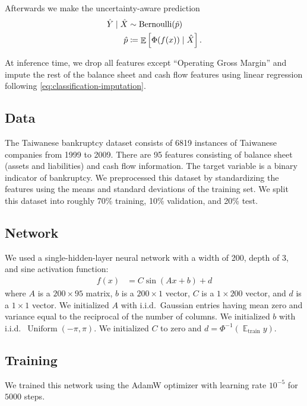 \documentclass{article}
\DeclareMathOperator{\expect}{\mathbb{E}}
\begin{document}
Afterwards we make the uncertainty-aware prediction
\begin{align}
  \hat Y \mid \hat X &\sim \operatorname{Bernoulli}(\hat p)
  \\
  \hat p &\coloneqq \expect\sbr{\Phi(f(x)) \mid \hat X}.
  \label{eq:classification-mean}
\end{align}


At inference time, we drop all features except ``Operating Gross Margin'' and impute the rest of the balance sheet and cash flow features using linear regression following \eqref{eq:classification-imputation}.

\subsection{Data}
The Taiwanese bankruptcy dataset \citep{unknown_taiwanese_2020,liang_financial_2016} consists of 6819 instances of Taiwanese companies from 1999 to 2009.
There are 95 features consisting of balance sheet (assets and liabilities) and cash flow information.
The target variable is a binary indicator of bankruptcy.
We preprocessed this dataset by standardizing the features using the means and standard deviations of the training set.
We split this dataset into roughly 70\% training, 10\% validation, and 20\% test.


\subsection{Network}
We used a single-hidden-layer neural network with a width of 200, depth of 3, and sine activation function:
\begin{align}
  f(x) &= C \sin(A x + b) + d
\end{align}
where \(A\) is a \(200 \times 95\) matrix, \(b\) is a \(200 \times 1\) vector, \(C\) is a \(1 \times 200\) vector, and \(d\) is a \(1 \times 1\) vector.
We initialized \(A\) with i.i.d.~Gaussian entries having mean zero and variance equal to the reciprocal of the number of columns.
We initialized \(b\) with i.i.d.~\(\operatorname{Uniform}(-\pi, \pi)\).
We initialized \(C\) to zero and \(d = \Phi^{-1}(\expect_\text{train} y)\).

\subsection{Training}
We trained this network using the AdamW optimizer \citep{loshchilov_decoupled_2019,deepmind_deepmind_2020} with learning rate \(10^{-5}\) for \(5000\) steps.
\end{document}
